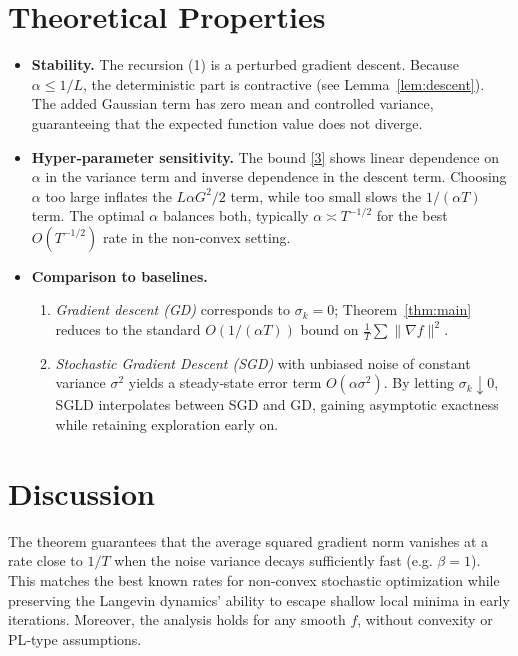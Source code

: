 \documentclass{article}
\begin{document}
\section*{Theoretical Properties}
\begin{itemize}
\item \textbf{Stability.} The recursion (1) is a perturbed gradient descent. Because $\alpha\le1/L$, the deterministic part is contractive (see Lemma~\ref{lem:descent}). The added Gaussian term has zero mean and controlled variance, guaranteeing that the expected function value does not diverge.
\item \textbf{Hyper‑parameter sensitivity.} The bound \eqref{3} shows linear dependence on $\alpha$ in the variance term and inverse dependence in the descent term. Choosing $\alpha$ too large inflates the $L\alpha G^{2}/2$ term, while too small slows the $1/(\alpha T)$ term. The optimal $\alpha$ balances both, typically $\alpha\asymp T^{-1/2}$ for the best $O(T^{-1/2})$ rate in the non‑convex setting.
\item \textbf{Comparison to baselines.}
    \begin{enumerate}
        \item \emph{Gradient descent (GD)} corresponds to $\sigma_{k}=0$; Theorem~\ref{thm:main} reduces to the standard $O(1/(\alpha T))$ bound on $\frac1T\sum\|\nabla f\|^{2}$.
        \item \emph{Stochastic Gradient Descent (SGD)} with unbiased noise of constant variance $\sigma^{2}$ yields a steady‑state error term $O(\alpha\sigma^{2})$. By letting $\sigma_{k}\downarrow0$, SGLD interpolates between SGD and GD, gaining asymptotic exactness while retaining exploration early on.
    \end{enumerate}
\end{itemize}

\section*{Discussion}
The theorem guarantees that the average squared gradient norm vanishes at a rate close to $1/T$ when the noise variance decays sufficiently fast (e.g. $\beta=1$). This matches the best known rates for non‑convex stochastic optimization while preserving the Langevin dynamics’ ability to escape shallow local minima in early iterations. Moreover, the analysis holds for any smooth $f$, without convexity or PL‑type assumptions.

\newpage
\end{document}
